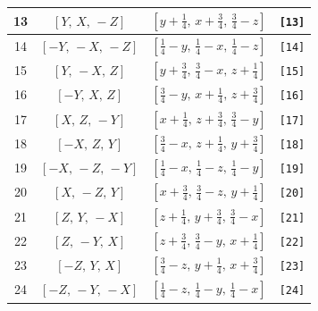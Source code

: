 \documentclass[fleqn,8pt]{jsarticle}
\begin{document}
\begin{longtable}{cccc}
13 & $\left[ Y,\, X,\, - Z \right]$ & $\left[ y + \frac{1}{4},\, x + \frac{3}{4},\, \frac{3}{4} - z \right]$ & {\tt [13]} \\ \hline
14 & $\left[ - Y,\, - X,\, - Z \right]$ & $\left[ \frac{1}{4} - y,\, \frac{1}{4} - x,\, \frac{1}{4} - z \right]$ & {\tt [14]} \\ \hline
15 & $\left[ Y,\, - X,\, Z \right]$ & $\left[ y + \frac{3}{4},\, \frac{3}{4} - x,\, z + \frac{1}{4} \right]$ & {\tt [15]} \\ \hline
16 & $\left[ - Y,\, X,\, Z \right]$ & $\left[ \frac{3}{4} - y,\, x + \frac{1}{4},\, z + \frac{3}{4} \right]$ & {\tt [16]} \\ \hline
17 & $\left[ X,\, Z,\, - Y \right]$ & $\left[ x + \frac{1}{4},\, z + \frac{3}{4},\, \frac{3}{4} - y \right]$ & {\tt [17]} \\ \hline
18 & $\left[ - X,\, Z,\, Y \right]$ & $\left[ \frac{3}{4} - x,\, z + \frac{1}{4},\, y + \frac{3}{4} \right]$ & {\tt [18]} \\ \hline
19 & $\left[ - X,\, - Z,\, - Y \right]$ & $\left[ \frac{1}{4} - x,\, \frac{1}{4} - z,\, \frac{1}{4} - y \right]$ & {\tt [19]} \\ \hline
20 & $\left[ X,\, - Z,\, Y \right]$ & $\left[ x + \frac{3}{4},\, \frac{3}{4} - z,\, y + \frac{1}{4} \right]$ & {\tt [20]} \\ \hline
21 & $\left[ Z,\, Y,\, - X \right]$ & $\left[ z + \frac{1}{4},\, y + \frac{3}{4},\, \frac{3}{4} - x \right]$ & {\tt [21]} \\ \hline
22 & $\left[ Z,\, - Y,\, X \right]$ & $\left[ z + \frac{3}{4},\, \frac{3}{4} - y,\, x + \frac{1}{4} \right]$ & {\tt [22]} \\ \hline
23 & $\left[ - Z,\, Y,\, X \right]$ & $\left[ \frac{3}{4} - z,\, y + \frac{1}{4},\, x + \frac{3}{4} \right]$ & {\tt [23]} \\ \hline
24 & $\left[ - Z,\, - Y,\, - X \right]$ & $\left[ \frac{1}{4} - z,\, \frac{1}{4} - y,\, \frac{1}{4} - x \right]$ & {\tt [24]} \\
\end{longtable}
\end{document}
